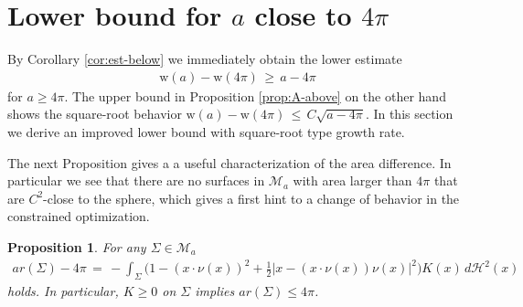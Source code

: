 \documentclass[reqno,makeidx,12pt]{amsart}
\theoremstyle{note}
\newtheorem{proposition}{Proposition}
\theoremstyle{definition}
\begin{document}
\section{Lower bound for $a$ close to $4\pi$}
\label{sec:lb-4pi}
By Corollary \ref{cor:est-below} we immediately obtain the lower estimate
\begin{gather}
	{\text{w}}(a)-{\text{w}}(4\pi)\,\geq\, a-4\pi \label{eq:lb-lin}
\end{gather}
for $a\geq 4\pi$. The upper bound in Proposition \ref{prop:A-above} on the other hand shows the square-root behavior ${\text{w}}(a)-{\text{w}}(4\pi)\,\leq\,C\sqrt{ a-4\pi}$. In this section we derive an improved lower bound with square-root type growth rate.

 The next Proposition gives a  a useful characterization of the area difference. In particular we see that there are no surfaces in ${\mathcal{M}}_a$ with area larger
than $4\pi$ that are $C^2$-close to the sphere, which gives a first hint to a change of behavior in the constrained optimization.
\begin{proposition}\label{prop:4pi-est-below}
For any $\Sigma\in{\mathcal{M}}_a$ 
\begin{gather}
  {ar}(\Sigma) -4\pi\,=\, -\int_\Sigma \Big(1-(x\cdot\nu(x))^2 +
  \frac{1}{2}|x- (x\cdot\nu(x))\nu(x)|^2\Big) K(x)\,d{\ensuremath{\mathcal{H}}}^2(x) \label{eq:K-M}
\end{gather}
holds.
In particular, $K\geq 0$ on $\Sigma$ implies ${ar}(\Sigma)\leq 4\pi$.
\end{proposition}
\end{document}
